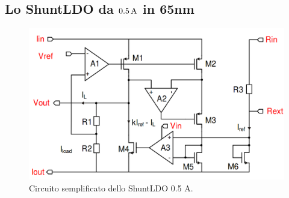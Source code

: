 \subsection{Lo ShuntLDO da $0.5\rm \, A$ in 65nm}

 
\begin{figure}[!htbp]
\centering
\includegraphics[scale=.3]{Immagini/SLDO5A}
\caption{Circuito semplificato dello ShuntLDO 0.5 A.}
\label{SLDO5A}
\end{figure}

